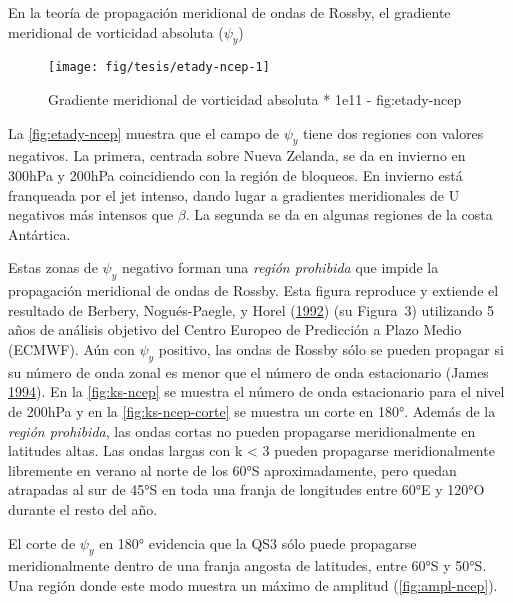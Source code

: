 \documentclass[spanish,a4paper]{book}
\begin{document}
En la teoría de propagación meridional de ondas de Rossby, el gradiente
meridional de vorticidad absoluta (\(\psi_y\))

\begin{landscape}\begin{figure}

{\centering \texttt{[image: fig/tesis/etady-ncep-1]} 

}

\caption{Gradiente meridional de vorticidad absoluta * 1e11 - fig:etady-ncep}\label{fig:etady-ncep}
\end{figure}
\end{landscape}

La \autoref{fig:etady-ncep} muestra que el campo de \(\psi_y\) tiene dos
regiones con valores negativos. La primera, centrada sobre Nueva
Zelanda, se da en invierno en 300hPa y 200hPa coincidiendo con la región
de bloqueos. En invierno está franqueada por el jet intenso, dando lugar
a gradientes meridionales de U negativos más intensos que \(\beta\). La
segunda se da en algunas regiones de la costa Antártica.

Estas zonas de \(\psi_y\) negativo forman una \emph{región prohibida}
que impide la propagación meridional de ondas de Rossby. Esta figura
reproduce y extiende el resultado de Berbery, Nogués-Paegle, y Horel
(\protect\hyperlink{ref-Berbery1992}{1992}) (su Figura~3) utilizando 5
años de análisis objetivo del Centro Europeo de Predicción a Plazo Medio
(ECMWF). Aún con \(\psi_y\) positivo, las ondas de Rossby sólo se pueden
propagar si su número de onda zonal es menor que el número de onda
estacionario (James \protect\hyperlink{ref-James}{1994}). En la
\autoref{fig:ks-ncep} se muestra el número de onda estacionario para el
nivel de 200hPa y en la \autoref{fig:ks-ncep-corte} se muestra un corte
en 180°. Además de la \emph{región prohibida}, las ondas cortas no
pueden propagarse meridionalmente en latitudes altas. Las ondas largas
con k \textless{} 3 pueden propagarse meridionalmente libremente en
verano al norte de los 60°S aproximadamente, pero quedan atrapadas al
sur de 45°S en toda una franja de longitudes entre 60°E y 120°O durante
el resto del año.

El corte de \(\psi_y\) en 180° evidencia que la QS3 sólo puede
propagarse meridionalmente dentro de una franja angosta de latitudes,
entre 60°S y 50°S. Una región donde este modo muestra un máximo de
amplitud (\autoref{fig:ampl-ncep}).
\end{document}
